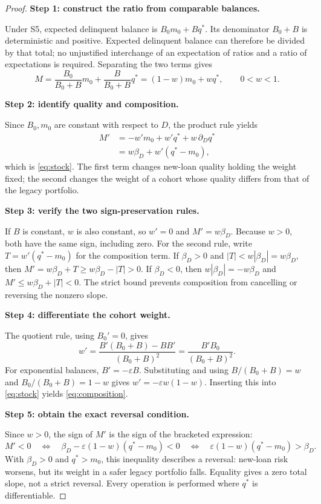 \documentclass[11pt]{article}
\theoremstyle{definition}\newtheorem{assumption}{Assumption}
\begin{document}
\begin{proof}
\textbf{Step 1: construct the ratio from comparable balances.}\par
Under S5, expected delinquent balance is $B_0m_0+Bq^*$. Its denominator
$B_0+B$ is deterministic and positive. Expected delinquent balance can
therefore be divided by that total; no unjustified interchange of an
expectation of ratios and a ratio of expectations is required. Separating
the two terms gives
\[
M=\frac{B_0}{B_0+B}m_0+\frac{B}{B_0+B}q^*
  =(1-w)m_0+wq^*,\qquad 0<w<1.
\]

\textbf{Step 2: identify quality and composition.}\par
Since $B_0,m_0$ are constant with respect to $D$, the product rule yields
\begin{align*}
M'&=-w'm_0+w'q^*+w\,\partial_Dq^*\\
  &=w\beta_D+w'(q^*-m_0),
\end{align*}
which is \eqref{eq:stock}. The first term changes new-loan quality holding
the weight fixed; the second changes the weight of a cohort whose quality
differs from that of the legacy portfolio.

\textbf{Step 3: verify the two sign-preservation rules.}\par
If $B$ is constant, $w$ is also constant, so $w'=0$ and $M'=w\beta_D$.
Because $w>0$, both have the same sign, including zero. For the second rule,
write $T=w'(q^*-m_0)$ for the composition term. If $\beta_D>0$ and
$|T|<w|\beta_D|=w\beta_D$, then
$M'=w\beta_D+T\ge w\beta_D-|T|>0$. If $\beta_D<0$, then
$w|\beta_D|=-w\beta_D$ and $M'\le w\beta_D+|T|<0$. The strict bound
prevents composition from cancelling or reversing the nonzero slope.

\textbf{Step 4: differentiate the cohort weight.}\par
The quotient rule, using $B_0'=0$, gives
\[
w'=\frac{B'(B_0+B)-BB'}{(B_0+B)^2}
   =\frac{B'B_0}{(B_0+B)^2}.
\]
For exponential balances, $B'=-\varepsilon B$. Substituting and using
$B/(B_0+B)=w$ and $B_0/(B_0+B)=1-w$ gives
$w'=-\varepsilon w(1-w)$. Inserting this into \eqref{eq:stock} yields
\eqref{eq:composition}.

\textbf{Step 5: obtain the exact reversal condition.}\par
Since $w>0$, the sign of $M'$ is the sign of the bracketed expression:
\[
M'<0\quad\Longleftrightarrow\quad
\beta_D-\varepsilon(1-w)(q^*-m_0)<0
\quad\Longleftrightarrow\quad
\varepsilon(1-w)(q^*-m_0)>\beta_D.
\]
With $\beta_D>0$ and $q^*>m_0$, this inequality describes a reversal:
new-loan risk worsens, but its weight in a safer legacy portfolio falls.
Equality gives a zero total slope, not a strict reversal. Every operation
is performed where $q^*$ is differentiable.
\end{proof}
\end{document}
